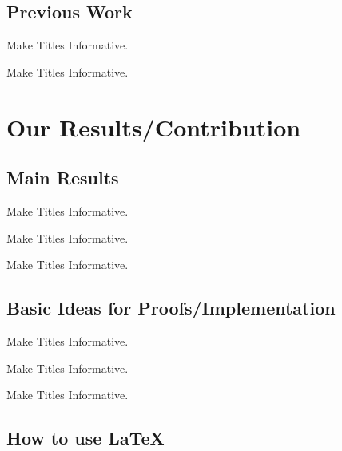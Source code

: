 \documentclass{beamer}
\begin{document}
\subsection{Previous Work}

\begin{frame}{Make Titles Informative.}
\end{frame}

\begin{frame}{Make Titles Informative.}
\end{frame}



\section{Our Results/Contribution}

\subsection{Main Results}

\begin{frame}{Make Titles Informative.}
\end{frame}

\begin{frame}{Make Titles Informative.}
\end{frame}

\begin{frame}{Make Titles Informative.}
\end{frame}


\subsection{Basic Ideas for Proofs/Implementation}

\begin{frame}{Make Titles Informative.}
\end{frame}

\begin{frame}{Make Titles Informative.}
\end{frame}

\begin{frame}{Make Titles Informative.}
\end{frame}


\subsection{How to use \LaTeX}
\end{document}
